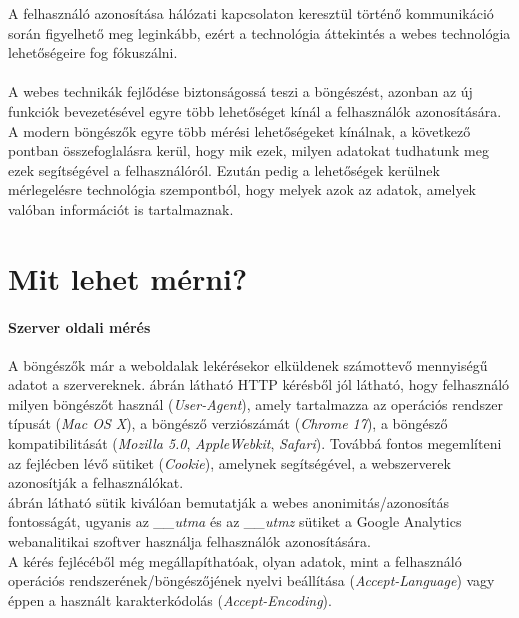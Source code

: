 
A felhasználó azonosítása hálózati kapcsolaton keresztül történő kommunikáció során figyelhető meg leginkább, ezért a technológia áttekintés a webes technológia lehetőségeire fog fókuszálni.\\
\\
A webes technikák fejlődése biztonságossá teszi a böngészést, azonban az új funkciók bevezetésével egyre több lehetőséget kínál a felhasználók azonosítására.\\
A modern böngészők egyre több mérési lehetőségeket kínálnak, a következő pontban összefoglalásra kerül, hogy mik ezek, milyen adatokat tudhatunk meg ezek segítségével a felhasználóról. Ezután pedig a lehetőségek kerülnek mérlegelésre technológia szempontból, hogy melyek azok az adatok, amelyek valóban információt is tartalmaznak.

\section{Mit lehet mérni?} %
\label{sec:miket_lehet_merni_}

\paragraph{Szerver oldali mérés} %
\label{par:szerver_oldali_meres}

A böngészők már a weboldalak lekérésekor elküldenek számottevő mennyiségű adatot a szervereknek.  ábrán látható HTTP kérésből jól látható, hogy felhasználó milyen böngészőt használ (\textit{User-Agent}), amely tartalmazza az operációs rendszer típusát (\textit{Mac OS X}), a böngésző verziószámát (\textit{Chrome 17}), a böngésző kompatibilitását (\textit{Mozilla 5.0}, \textit{AppleWebkit}, \textit{Safari}). Továbbá fontos megemlíteni az fejlécben lévő sütiket (\textit{Cookie}), amelynek segítségével, a webszerverek azonosítják a felhasználókat.\\
 ábrán látható sütik kiválóan bemutatják a webes anonimitás/azonosítás fontosságát, ugyanis az \textit{\_\_utma} és az \textit{\_\_utmz} sütiket a Google Analytics webanalitikai szoftver használja felhasználók azonosítására.\\
A kérés fejlécéből még megállapíthatóak, olyan adatok, mint a felhasználó operációs rendszerének/böngészőjének nyelvi beállítása (\textit{Accept-Language}) vagy éppen a használt karakterkódolás (\textit{Accept-Encoding}).\\
\clearpage

